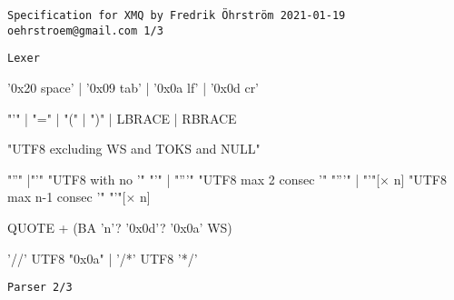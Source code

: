 \documentclass[10pt,a4paper]{article}
\begin{document}
\texttt{Specification for XMQ by Fredrik Öhrström 2021-01-19 \texttt{oehrstroem@gmail.com} \hfill 1/3}

\vspace{5mm}

\texttt{Lexer}

\vspace{5mm}

\raisebox{32pt}{WS:}
\begin{minipage}{15cm}
\begin{rail}
'0x20 space' | '0x09 tab' | '0x0a lf' | '0x0d cr'
\end{rail}
\end{minipage}

\raisebox{55pt}{TOKS:}
\begin{minipage}{15cm}
\begin{rail}
"'" | "=" | "(" | ")" | LBRACE | RBRACE
\end{rail}
\end{minipage}

\raisebox{-4pt}{TEXT:}
\begin{minipage}{15cm}
\begin{rail}
"UTF8 excluding WS and TOKS and NULL"
\end{rail}
\end{minipage}

\raisebox{32pt}{QUOTE:}
\begin{minipage}{15cm}
\begin{rail}
  "''"
  |"'" "UTF8 with no '" "'"
  | "'''" "UTF8 max 2 consec '" "'''"
  | "'"[$\times$ n] "UTF8 max n-1 consec '" "'"[$\times$ n]
\end{rail}
\end{minipage}

\raisebox{20pt}{QUOTES:}
\begin{minipage}{15cm}
  \begin{rail}
  QUOTE + (BA 'n'? '0x0d'? '0x0a' WS)
\end{rail}
\end{minipage}

\raisebox{8pt}{COMMENT:}
\begin{minipage}{15cm}
\begin{rail}
  '//' UTF8 "0x0a"
  | '/*' UTF8 '*/'
\end{rail}
\end{minipage}

\pagebreak

\texttt{Parser \hfill 2/3}

\vspace{5mm}
\end{document}
